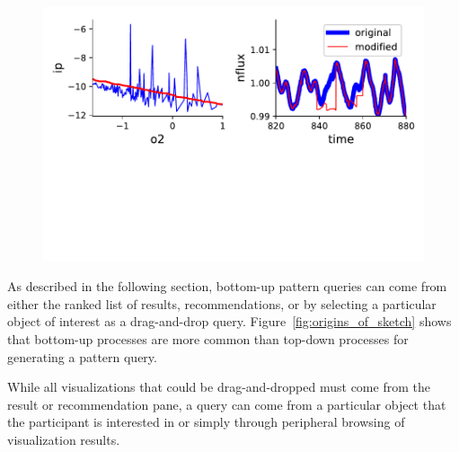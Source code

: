 \begin{figure}[h!]
    \centering
    \includegraphics[width=\columnwidth]{figures/QueryModificationBySketch.pdf}
    \caption{
    \label{query_modification}}
    \vspace{-10pt}
\end{figure}
As described in the following section, 
bottom-up pattern queries can come from either 
the ranked list of results, 
recommendations, or by selecting a 
particular object of interest as a drag-and-drop query. 
Figure~\ref{fig:origins_of_sketch} shows that 
bottom-up processes are more common 
than top-down processes for generating a pattern query.

While all visualizations that could be drag-and-dropped 
must come from the result or recommendation pane, 
a query can come from a particular object 
that the participant is interested in or simply 
through peripheral browsing of visualization results.

